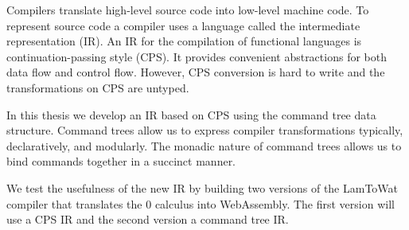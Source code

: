 
Compilers translate high-level source code into low-level machine code. To represent source code a compiler uses a language called the intermediate representation (IR). An IR for the compilation of functional languages is continuation-passing style (CPS). It provides convenient abstractions for both data flow and control flow. However, CPS conversion is hard to write and the transformations on CPS are untyped.

In this thesis we develop an IR based on CPS using the command tree data structure. Command trees allow us to express compiler transformations typically, declaratively, and modularly. The monadic nature of command trees allows us to bind commands together in a succinct manner.

We test the usefulness of the new IR by building two versions of the LamToWat compiler that translates the 0 calculus into WebAssembly. The first version will use a CPS IR and the second version a command tree IR.